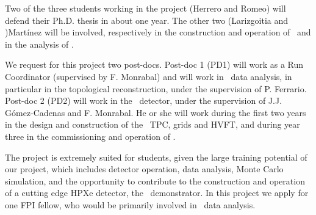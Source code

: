 Two of the three students working in the project (Herrero and Romeo) will defend their Ph.D. thesis in about one year. The other two (Larizgoitia and )Mart\'inez will be involved, respectively in the construction and operation of \HDEMO\ and in the analysis of \Next. 

We request for this project two post-docs. Post-doc 1 (PD1) will work as a Run Coordinator (supervised by F. Monrabal) and will work in \Next\ data analysis, in particular in the topological reconstruction, under the supervision of P. Ferrario. Post-doc 2 (PD2) will work in the \HDEMO\ detector, under the supervision of J.J. G\'omez-Cadenas and F. Monrabal. He or she will work during the first two years in the design and construction of the
\HDEMO\ TPC, grids and HVFT, and during year three in the commissioning and operation of \NHD. 

The project is extremely suited for students, given the large training potential of our project, which includes detector operation, data analysis, Monte Carlo simulation, and the opportunity to contribute to the construction and operation of a cutting edge HPXe detector, the \HDEMO\ demonstrator. In this project we apply for one FPI fellow, who would be primarily involved in \Next\ data analysis. 
